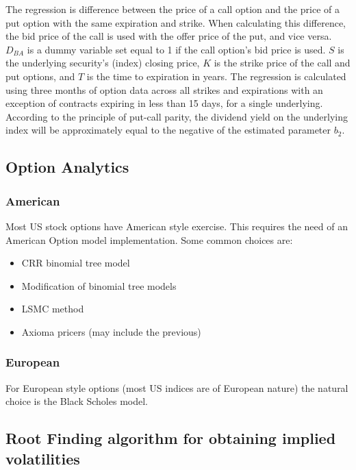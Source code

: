 \documentclass[11pt,confidential]{article}
\begin{document}
The regression is difference between the price of a call option and the price of a put
option with the same expiration and strike. When calculating this difference, the bid
price of the call is used with the offer price of the put, and vice versa. $D_{BA}$ is a dummy 
variable set equal to 1 if the call option's bid price is used. $S$ is the underlying security's
(index) closing price, $K$ is the strike price of the call and put options, and $T$ is the time
to expiration in years. The regression is calculated using three months of option data
across all strikes and expirations with an exception of contracts expiring in less than 15
days, for a single underlying. According to the principle of put-call parity, the dividend
yield on the underlying index will be approximately equal to the negative of the estimated
parameter $b_2$.






\subsection{Option Analytics}

\subsubsection{American}

Most US stock options have American style exercise. This requires the need of an American Option model implementation. Some common choices are:

\begin{itemize}

\item CRR binomial tree model
\item Modification of binomial tree models
\item LSMC method
\item Axioma pricers (may include the previous)

\end{itemize}

\subsubsection{European}

For European style options (most US indices are of European nature) the natural choice is the Black Scholes model.


\subsection{Root Finding algorithm for obtaining implied volatilities}
\end{document}
